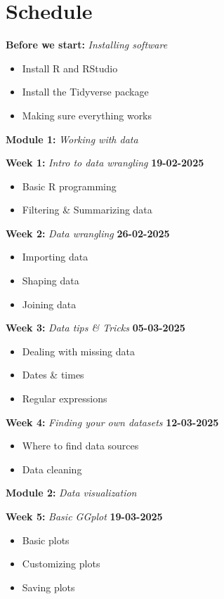 \documentclass{article}
\newcommand{\week}[3]{
    \begin{center}
        \textbf{#1:} \textit{#2} \dotfill \textbf{#3}
    \end{center}
}
\newcommand{\module}[2]{
    \vspace{2em}
    \large
    \textbf{#1:} \textit{#2}
    \normalsize
}
\begin{document}
\section*{Schedule}

\module{Before we start}{Installing software}
\begin{itemize}
    \item Install R and RStudio
    \item Install the Tidyverse package
    \item Making sure everything works
\end{itemize}

\module{Module 1}{Working with data}

\week{Week 1}{Intro to data wrangling}{19-02-2025}
\begin{itemize}
    \item Basic R programming
    \item Filtering \& Summarizing data
\end{itemize}

\week{Week 2}{Data wrangling}{26-02-2025}
\begin{itemize}
    \item Importing data
    \item Shaping data
    \item Joining data
\end{itemize}

\week{Week 3}{Data tips \& Tricks}{05-03-2025}
\begin{itemize}
    \item Dealing with missing data
    \item Dates \& times
    \item Regular expressions
\end{itemize}

\week{Week 4}{Finding your own datasets}{12-03-2025}
\begin{itemize}
    \item Where to find data sources
    \item Data cleaning
\end{itemize}

\module{Module 2}{Data visualization}

\week{Week 5}{Basic GGplot}{19-03-2025}
\begin{itemize}
    \item Basic plots
    \item Customizing plots
    \item Saving plots
\end{itemize}
\end{document}
